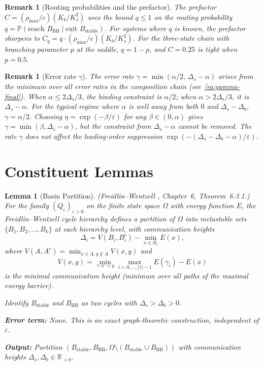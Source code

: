 \documentclass[11pt]{article}
\newtheorem{lemma}[theorem]{Lemma}
\newtheorem{remark}[theorem]{Remark}
\newcommand{\eps}{\varepsilon}
\newcommand{\Ds}{\Delta_s}
\newcommand{\Db}{\Delta_b}
\newcommand{\Bstable}{B_{\mathrm{stable}}}
\newcommand{\BBB}{B_{\mathrm{BB}}}
\begin{document}
\begin{remark}[Routing probabilities and the prefactor]\label{rem:routing}
The prefactor $C = (\rho_{\max}/c)(K_b/K_s^2)$ uses the bound
$q \leq 1$ on the routing probability
$q = \mathbb{P}(\text{reach } \BBB \mid \text{exit } \Bstable)$.
For systems where $q$ is known, the prefactor sharpens to
$C_q = q \cdot (\rho_{\max}/c)(K_b/K_s^2)$.
For the three-state chain with branching parameter $p$ at the saddle,
$q = 1-p$, and $C = 0.25$ is tight when $p = 0.5$.
\end{remark}

\begin{remark}[Error rate $\gamma$]\label{rem:gamma}
The error rate $\gamma = \min(\alpha/2,\, \Ds - \alpha)$ arises from
the minimum over all error rates in the composition chain
(see~\eqref{eq:gamma-final}).  When $\alpha \leq 2\Ds/3$, the
binding constraint is $\alpha/2$; when $\alpha > 2\Ds/3$, it is
$\Ds - \alpha$.  For the typical regime where $\alpha$ is well away
from both $0$ and $\Ds - \Db$, $\gamma = \alpha/2$.
Choosing $\eta = \exp(-\beta/\eps)$ for any
$\beta \in (0, \alpha)$ gives $\gamma = \min(\beta, \Ds - \alpha)$,
but the constraint from $\Ds - \alpha$ cannot be removed.
The rate $\gamma$ does not affect the
leading-order suppression $\exp(-(\Ds - \Db - \alpha)/\eps)$.
\end{remark}

\section{Constituent Lemmas}
\label{sec:lemmas}

\begin{lemma}[Basin Partition]\label{lem:partition}
\textnormal{(Freidlin--Wentzell \cite{FW12}, Chapter~6,
Theorem~6.3.1.)}
For the family $(Q_\eps)_{\eps > 0}$ on the finite state space
$\Omega$ with energy function $E$, the Freidlin--Wentzell cycle
hierarchy defines a partition of $\Omega$ into metastable sets
$\{B_1, B_2, \ldots, B_k\}$ at each hierarchy level, with
communication heights
\[
  \Delta_i = V(B_i, B_i^c) - \min_{x \in B_i} E(x),
\]
where $V(A, A^c) = \min_{x \in A, y \notin A} V(x,y)$ and
\[
  V(x,y) = \min_{\gamma: x \to y} \max_{i=0,\ldots,|\gamma|-1}
  E(\gamma_i) - E(x)
\]
is the minimal communication height (minimum over all paths of the
maximal energy barrier).

Identify $\Bstable$ and $\BBB$ as two cycles with
$\Ds > \Db > 0$.

\medskip\noindent
\textbf{Error term:} None. This is an exact graph-theoretic
construction, independent of $\eps$.

\medskip\noindent
\textbf{Output:} Partition $(\Bstable, \BBB,
\Omega \setminus (\Bstable \cup \BBB))$ with communication
heights $\Ds, \Db \in \mathbb{R}_{>0}$.
\end{lemma}
\end{document}
